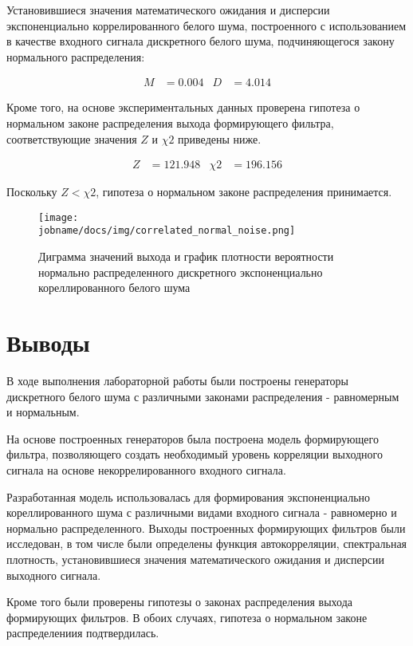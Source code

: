 Установившиеся значения математического ожидания и дисперсии экспоненциально коррелированного белого шума,
построенного с использованием в качестве входного сигнала дискретного белого шума, подчиняющегося закону нормального
распределения:

\begin{align*}
    M & = 0.004 & D & = 4.014
\end{align*}

Кроме того, на основе экспериментальных данных проверена гипотеза о нормальном законе распределения выхода формирующего
фильтра, соответствующие значения $Z$ и $\chi2$ приведены ниже.

\begin{align*}
    Z & = 121.948 & \chi2 & = 196.156
\end{align*}

Поскольку $Z < \chi2$, гипотеза о нормальном законе распределения принимается.

\begin{figure}[h!]
    \centering
    \texttt{[image: \\jobname/docs/img/correlated\_normal\_noise.png]}
    \caption{Диграмма значений выхода и график плотности вероятности нормально распределенного дискретного
    экспоненциально кореллированного белого шума}
\end{figure}

\clearpage

\section*{Выводы}

В ходе выполнения лабораторной работы были построены генераторы дискретного белого шума с различными законами
распределения - равномерным и нормальным.

На основе построенных генераторов была построена модель формирующего фильтра, позволяющего создать необходимый
уровень корреляции выходного сигнала на основе некоррелированного входного сигнала.

Разработанная модель использовалась для формирования экспоненциально кореллированного шума с различными видами
входного сигнала - равномерно и нормально распределенного.
Выходы построенных формирующих фильтров были исследован, в том числе были определены функция автокорреляции,
спектральная плотность, установившиеся значения математического ожидания и дисперсии выходного сигнала.

Кроме того были проверены гипотезы о законах распределения выхода формирующих фильтров. В обоих случаях, гипотеза
о нормальном законе распределениия подтвердилась.


